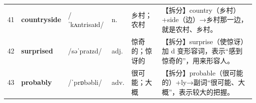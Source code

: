 \documentclass[UTF8,a4paper,11pt,oneside]{ctexbook}
\newcommand{\cellword}[1]{{\bfseries\textcolor{wordcol}{#1}}}
\newcommand{\cellipa}[1]{{\footnotesize\textcolor{ipacol}{#1}}}
\newcommand{\cellpos}[1]{\textcolor{poscol}{#1}}
\newcommand{\cellno}[1]{\textcolor{volcolor!75!black}{#1}}
\begin{document}
{\begin{longtable}{@{}C{0.045\textwidth}L{0.155\textwidth}L{0.175\textwidth}C{0.070\textwidth}L{0.180\textwidth}L{0.282\textwidth}@{}}
 \cellno{41} & \cellword{countryside} & \cellipa{/ˈkʌntrisaɪd/} & \cellpos{n.} & 乡村；农村 & \textcolor{tagSplit}{【拆分】}country（乡村）+side（边）→\allowbreak{}乡村那一边，就是农村、乡村。 \\
\cellno{42} & \cellword{surprised} & \cellipa{/səˈpraɪzd/} & \cellpos{adj.} & 惊奇的；惊讶的 & \textcolor{tagSplit}{【拆分】}surprise（使惊讶）加 d 变形容词，表示“感到惊奇的”，用来形容人。 \\
 \cellno{43} & \cellword{probably} & \cellipa{/ˈprɒbəbli/} & \cellpos{adv.} & 很可能；大概 & \textcolor{tagSplit}{【拆分】}probable（很可能的）+ly→\allowbreak{}副词“很可能、大概”，表示较大的把握。 \\
\end{longtable}
}

\end{document}
